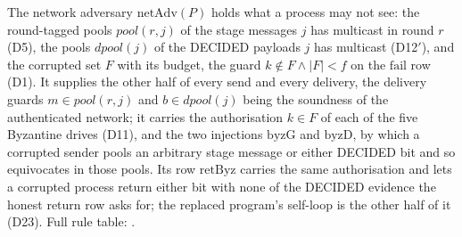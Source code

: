 \begin{definition}
  \label{def:aba-netadv}
  \leanok
  The network adversary $\mathrm{netAdv}(P)$ holds what a process may not see: the round-tagged pools $pool(r,j)$ of the stage messages $j$ has multicast in round $r$ (D5), the pools $dpool(j)$ of the DECIDED payloads $j$ has multicast (D12$'$), and the corrupted set $F$ with its budget, the guard $k \notin F \wedge |F| < f$ on the $\mathrm{fail}$ row (D1).
  It supplies the other half of every send and every delivery, the delivery guards $m \in pool(r,j)$ and $b \in dpool(j)$ being the soundness of the authenticated network; it carries the authorisation $k \in F$ of each of the five Byzantine drives (D11), and the two injections $\mathrm{byzG}$ and $\mathrm{byzD}$, by which a corrupted sender pools an arbitrary stage message or either DECIDED bit and so equivocates in those pools.
  Its row $\mathrm{retByz}$ carries the same authorisation and lets a corrupted process return either bit with none of the DECIDED evidence the honest return row asks for; the replaced program's self-loop is the other half of it (D23).
  Full rule table: .
\end{definition}
